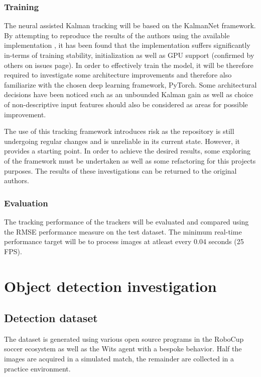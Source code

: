 \documentclass[a4paper,twoside,12pt]{report}
\begin{document}
\subsection{Training}
The neural assisted Kalman tracking will be based on the KalmanNet framework. By attempting to reproduce the results of the authors using the available implementation \cite{kalmangit}, it has been found that the implementation suffers significantly in-terms of training stability, initialization as well as GPU support (confirmed by others on issues page). In order to effectively train the model, it will be therefore required to investigate some architecture improvements and therefore  also familiarize with the chosen deep learning framework, PyTorch. Some architectural decisions have been noticed such as an unbounded Kalman gain as well as choice of non-descriptive input features should also be considered as areas for possible improvement.  

The use of this tracking framework introduces risk as the repository is still undergoing regular changes and is unreliable in its current state. However, it provides a starting point. In order to achieve the desired results, some exploring of the framework must be undertaken as well as some refactoring for this projects purposes. The results of these investigations can be returned to the original authors.

\subsection{Evaluation}

The tracking performance of the trackers will be evaluated and compared using the RMSE performance measure on the test dataset. The minimum real-time performance target will be to process images at atleast every 0.04 seconds (25 FPS).
\chapter{Object detection investigation}

\section{Detection dataset}
The dataset is generated using various open source programs in the RoboCup soccer ecosystem as well as the Wits agent with a bespoke behavior. Half the images are acquired in a simulated match, the remainder are collected in a practice environment.
\end{document}
